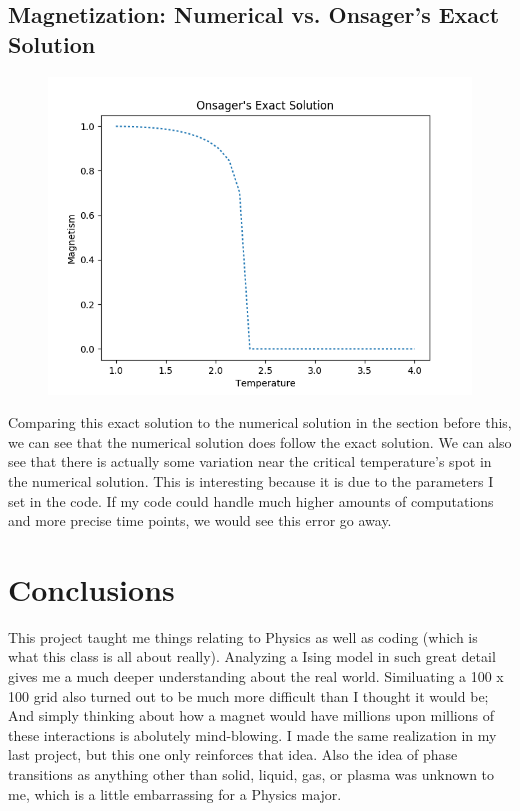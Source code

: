 \documentclass[12pt]{article}
\begin{document}
\subsection*{Magnetization: Numerical vs. Onsager's Exact Solution}

\begin{figure}[H]
\begin{center}
\includegraphics[scale=0.8]{onsager.png}
\end{center}
\end{figure}

Comparing this exact solution to the numerical solution in the section before this, we can see that the numerical solution does follow the exact solution. We can also see that there is actually some variation near the critical temperature's spot in the numerical solution. This is interesting because it is due to the parameters I set in the code. If my code could handle much higher amounts of computations and more precise time points, we would see this error go away.



\section{Conclusions}

This project taught me things relating to Physics as well as coding (which is what this class is all about really). Analyzing a Ising model in such great detail gives me a much deeper understanding about the real world. Similuating a 100 x 100 grid also turned out to be much more difficult than I thought it would be; And simply thinking about how a magnet would have millions upon millions of these interactions is abolutely mind-blowing. I made the same realization in my last project, but this one only reinforces that idea. Also the idea of phase transitions as anything other than solid, liquid, gas, or plasma was unknown to me, which is a little embarrassing for a Physics major.
\end{document}

